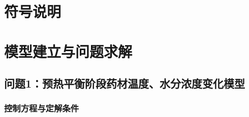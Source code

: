 \documentclass{ctexart}
\begin{document}
\section{符号说明}

\section{模型建立与问题求解}

\subsection{问题1：预热平衡阶段药材温度、水分浓度变化模型}

\subsubsection{控制方程与定解条件}
\end{document}
